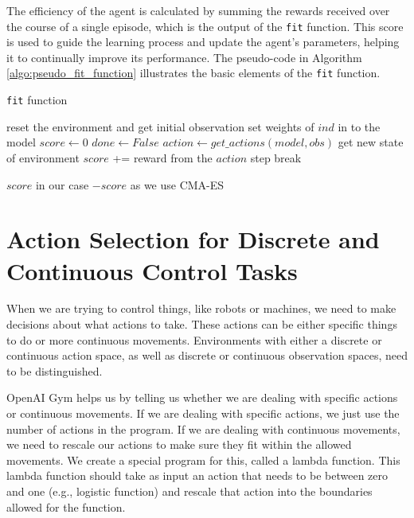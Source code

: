 The efficiency of the agent is calculated by summing the rewards received over the course of a single episode, which is the output of the \texttt{fit} function. This score is used to guide the learning process and update the agent's parameters, helping it to continually improve its performance. The pseudo-code in Algorithm \ref{algo:pseudo_fit_function} illustrates the basic elements of the \texttt{fit} function.





\begin{algorithm}
\caption{\texttt{fit} function}
\label{algo:pseudo_fit_function}
\begin{algorithmic}
\State reset the environment and get initial observation
\State set weights of $ind$ in to the model
\State $score \gets 0$
\State $ done \gets False$ 
    \State $action \gets get\_actions(model, obs)$
    \State get new state of environment
    \State $score$ += reward from the $action$ step
        \State break
    \EndIf
\EndFor

\Return $score$ \Comment in our case $-score$ as we use CMA-ES
\EndFunction
\end{algorithmic}
\end{algorithm}


\section{Action Selection for Discrete and Continuous Control Tasks}
\label{env_model_interface}

When we are trying to control things, like robots or machines, we need to make decisions about what actions to take. These actions can be either specific things to do or more continuous movements. Environments with either a discrete or continuous action space, as well as discrete or continuous observation spaces, need to be distinguished.

OpenAI Gym helps us by telling us whether we are dealing with specific actions or continuous movements. If we are dealing with specific actions, we just use the number of actions in the program. If we are dealing with continuous movements, we need to rescale our actions to make sure they fit within the allowed movements. We create a special program for this, called a lambda function. This lambda function should take as input an action that needs to be between zero and one (e.g., logistic function) and rescale that action into the boundaries allowed for the function.

